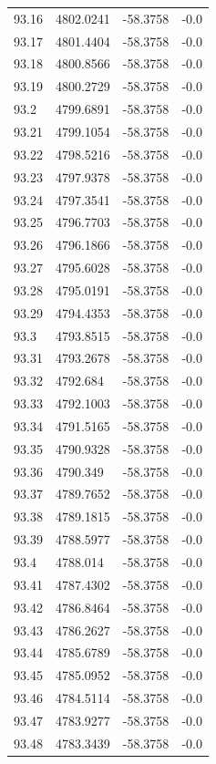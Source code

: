 \begin{table}[H]
\begin{tabular}{llll}
93.16 & 4802.0241 & -58.3758 & -0.0 \\
93.17 & 4801.4404 & -58.3758 & -0.0 \\
93.18 & 4800.8566 & -58.3758 & -0.0 \\
93.19 & 4800.2729 & -58.3758 & -0.0 \\
93.2 & 4799.6891 & -58.3758 & -0.0 \\
93.21 & 4799.1054 & -58.3758 & -0.0 \\
93.22 & 4798.5216 & -58.3758 & -0.0 \\
93.23 & 4797.9378 & -58.3758 & -0.0 \\
93.24 & 4797.3541 & -58.3758 & -0.0 \\
93.25 & 4796.7703 & -58.3758 & -0.0 \\
93.26 & 4796.1866 & -58.3758 & -0.0 \\
93.27 & 4795.6028 & -58.3758 & -0.0 \\
93.28 & 4795.0191 & -58.3758 & -0.0 \\
93.29 & 4794.4353 & -58.3758 & -0.0 \\
93.3 & 4793.8515 & -58.3758 & -0.0 \\
93.31 & 4793.2678 & -58.3758 & -0.0 \\
93.32 & 4792.684 & -58.3758 & -0.0 \\
93.33 & 4792.1003 & -58.3758 & -0.0 \\
93.34 & 4791.5165 & -58.3758 & -0.0 \\
93.35 & 4790.9328 & -58.3758 & -0.0 \\
93.36 & 4790.349 & -58.3758 & -0.0 \\
93.37 & 4789.7652 & -58.3758 & -0.0 \\
93.38 & 4789.1815 & -58.3758 & -0.0 \\
93.39 & 4788.5977 & -58.3758 & -0.0 \\
93.4 & 4788.014 & -58.3758 & -0.0 \\
93.41 & 4787.4302 & -58.3758 & -0.0 \\
93.42 & 4786.8464 & -58.3758 & -0.0 \\
93.43 & 4786.2627 & -58.3758 & -0.0 \\
93.44 & 4785.6789 & -58.3758 & -0.0 \\
93.45 & 4785.0952 & -58.3758 & -0.0 \\
93.46 & 4784.5114 & -58.3758 & -0.0 \\
93.47 & 4783.9277 & -58.3758 & -0.0 \\
93.48 & 4783.3439 & -58.3758 & -0.0 \\

\end{tabular}
\end{table}
